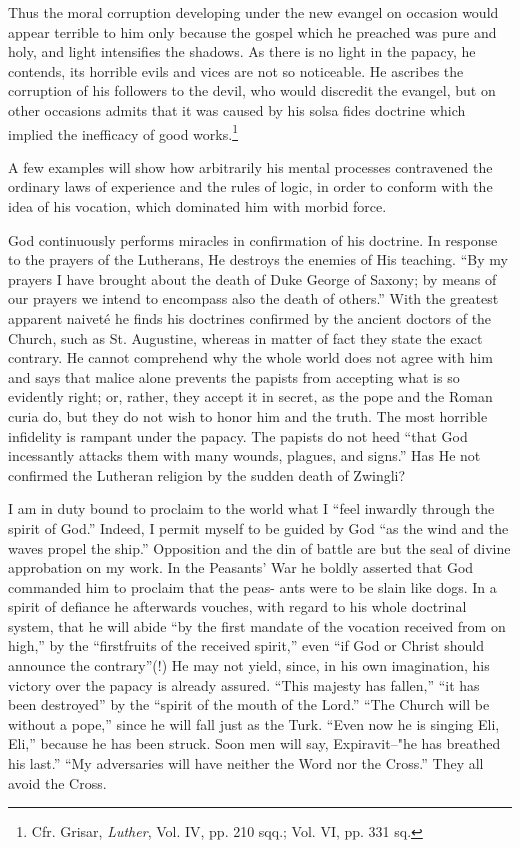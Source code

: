 Thus the moral corruption developing under the new evangel on occasion
would appear terrible to him only because the gospel which he preached was
pure and holy, and light intensifies the shadows. As there is no light in the
papacy, he contends, its horrible evils and vices are not so noticeable. He ascribes
the corruption of his followers to the devil, who would discredit the
evangel, but on other occasions admits that it was caused by his solsa fides
doctrine which implied the inefficacy of good works.\footnote
{Cfr. Grisar, \textit{Luther}, Vol. IV, pp. 210 sqq.; Vol. VI, pp. 331 sq.}

A few examples will show how arbitrarily his mental processes contravened
the ordinary laws of experience and the rules of logic, in order to
conform with the idea of his vocation, which dominated him with morbid
force.

God continuously performs miracles in confirmation of his doctrine. In
response to the prayers of the Lutherans, He destroys the enemies of His
teaching. “By my prayers I have brought about the death of Duke George
of Saxony; by means of our prayers we intend to encompass also the death of
others.” With the greatest apparent naiveté he finds his doctrines confirmed
by the ancient doctors of the Church, such as St. Augustine, whereas in
matter of fact they state the exact contrary. He cannot comprehend why
the whole world does not agree with him and says that malice alone prevents
the papists from accepting what is so evidently right; or, rather, they
accept it in secret, as the pope and the Roman curia do, but they do not
wish to honor him and the truth. The most horrible infidelity is rampant
under the papacy. The papists do not heed “that God incessantly attacks
them with many wounds, plagues, and signs.” Has He not confirmed the
Lutheran religion by the sudden death of Zwingli?

I am in duty bound to proclaim to the world what I “feel inwardly
through the spirit of God.” Indeed, I permit myself to be guided by God
``as the wind and the waves propel the ship.'' Opposition and the din of
battle are but the seal of divine approbation on my work. In the Peasants’
War he boldly asserted that God commanded him to proclaim that the peas-
ants were to be slain like dogs. In a spirit of defiance he afterwards vouches,
with regard to his whole doctrinal system, that he will abide “by the first
mandate of the vocation received from on high,” by the “firstfruits of the
received spirit,” even “if God or Christ should announce the contrary”(!)
He may not yield, since, in his own imagination, his victory over the papacy
is already assured. “This majesty has fallen,” “it has been destroyed” by the
``spirit of the mouth of the Lord.'' “The Church will be without a pope,”
since he will fall just as the Turk. “Even now he is singing Eli, Eli,” because
he has been struck. Soon men will say, Expiravit--"he has breathed his
last.” “My adversaries will have neither the Word nor the Cross.” They all
avoid the Cross.

